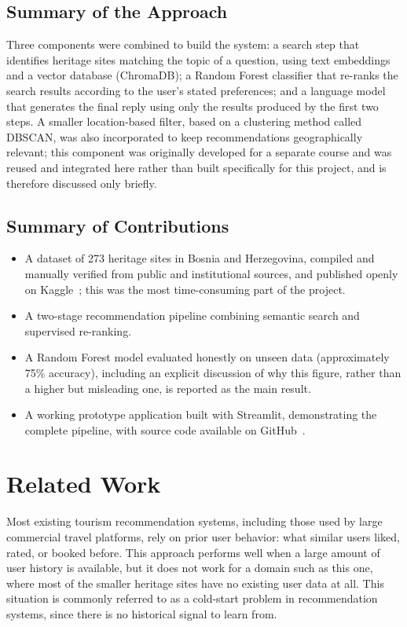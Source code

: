 \documentclass[conference]{IEEEtran}
\begin{document}
\subsection{Summary of the Approach}
Three components were combined to build the system: a search step that identifies heritage sites matching the topic of a question, using text embeddings and a vector database (ChromaDB); a Random Forest classifier that re-ranks the search results according to the user's stated preferences; and a language model that generates the final reply using only the results produced by the first two steps. A smaller location-based filter, based on a clustering method called DBSCAN, was also incorporated to keep recommendations geographically relevant; this component was originally developed for a separate course and was reused and integrated here rather than built specifically for this project, and is therefore discussed only briefly.

\subsection{Summary of Contributions}
\begin{itemize}
\item A dataset of 273 heritage sites in Bosnia and Herzegovina, compiled and manually verified from public and institutional sources, and published openly on Kaggle~\cite{kaggle}; this was the most time-consuming part of the project.
\item A two-stage recommendation pipeline combining semantic search and supervised re-ranking.
\item A Random Forest model evaluated honestly on unseen data (approximately 75\% accuracy), including an explicit discussion of why this figure, rather than a higher but misleading one, is reported as the main result.
\item A working prototype application built with Streamlit, demonstrating the complete pipeline, with source code available on GitHub~\cite{github}.
\end{itemize}

\section{Related Work}
Most existing tourism recommendation systems, including those used by large commercial travel platforms, rely on prior user behavior: what similar users liked, rated, or booked before. This approach performs well when a large amount of user history is available, but it does not work for a domain such as this one, where most of the smaller heritage sites have no existing user data at all. This situation is commonly referred to as a cold-start problem in recommendation systems, since there is no historical signal to learn from.
\end{document}
